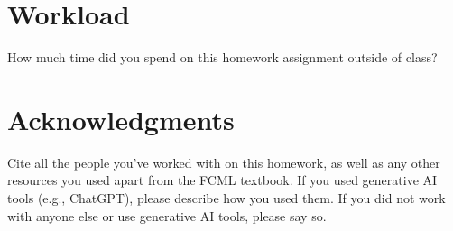 \documentclass[11pt]{article}
\begin{document}
\newpage

\section{Workload}

How much time did you spend on this homework assignment outside of class?

\section*{Acknowledgments}

Cite all the people you've worked with on this homework, as well as any other
resources you used apart from the FCML textbook. If you used generative AI
tools (e.g., ChatGPT), please describe how you used them.
If you did not work with anyone else or use generative AI tools, please say so.
\end{document}
